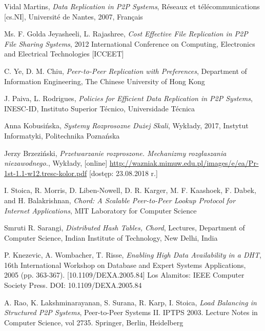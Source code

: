 \documentclass[12pt, twoside, openany]{report}
\begin{document}
\begin{thebibliography}{11}

 Vidal Martins, \emph{Data Replication in P2P Systems}, Réseaux et télécommunications [cs.NI], Université de Nantes, 2007, Français

 Ms. F. Golda Jeyasheeli, L. Rajashree, \emph{Cost Effective File Replication in P2P File Sharing Systems}, 2012 International Conference on Computing, Electronics and Electrical Technologies [ICCEET]
 
 C. Ye, D. M. Chiu, \emph{Peer-to-Peer Replication with Preferences}, Department of Information Engineering, The Chinese University of Hong Kong

 J. Paiva, L. Rodrigues, \emph{Policies for Efficient Data Replication in P2P Systems}, INESC-ID, Instituto Superior Técnico, Universidade Técnica

 Anna Kobusińska, \emph{Systemy Rozprosozne Dużej Skali}, Wykłady, 2017, Instytut Informatyki, Politechnika Poznańska

 Jerzy Brzeziński, \emph{Przetwarzanie rozproszone. Mechanizmy rozgłaszania niezawodnego.}, Wykłady, [online] \url{http://wazniak.mimuw.edu.pl/images/e/ea/Pr-1st-1.1-w12.tresc-kolor.pdf} [dostęp: 23.08.2018 r.]

  I. Stoica, R. Morris, D. Liben-Nowell, D. R. Karger, M. F. Kaashoek, F. Dabek, and H. Balakrishnan, \emph{Chord: A Scalable Peer-to-Peer Lookup Protocol for Internet Applications}, MIT Laboratory for Computer Science

 Smruti R. Sarangi, \emph{Distributed Hash Tables, Chord}, Lectures, Department of Computer Science, Indian Institute of Technology, New Delhi, India

 P. Knezevic, A. Wombacher, T. Risse, \emph{Enabling High Data Availability in a DHT}, 16th International Workshop on Database and Expert Systems Applications, 2005 (pp. 363-367). [10.1109/DEXA.2005.84] Los Alamitos: IEEE Computer Society Press. DOI: 10.1109/DEXA.2005.84

 A. Rao, K. Lakshminarayanan, S. Surana, R. Karp, I. Stoica, \emph{Load Balancing in Structured P2P Systems}, Peer-to-Peer Systems II. IPTPS 2003. Lecture Notes in Computer Science, vol 2735. Springer, Berlin, Heidelberg


\end{thebibliography}
\end{document}
